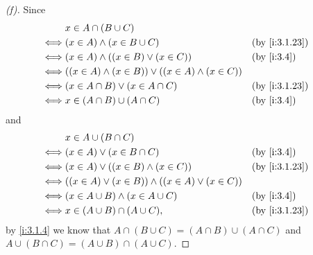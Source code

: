 \begin{proof}[(f)]
  Since
  \begin{align*}
         & x \in A \cap (B \cup C)                                                         \\
    \iff & (x \in A) \land (x \in B \cup C)                             &  & \by{i:3.1.23} \\
    \iff & (x \in A) \land ((x \in B) \lor (x \in C))                   &  & \by{i:3.4}    \\
    \iff & ((x \in A) \land (x \in B)) \lor ((x \in A) \land (x \in C))                    \\
    \iff & (x \in A \cap B) \lor (x \in A \cap C)                       &  & \by{i:3.1.23} \\
    \iff & x \in (A \cap B) \cup (A \cap C)                             &  & \by{i:3.4}
  \end{align*}
  and
  \begin{align*}
         & x \in A \cup (B \cap C)                                                        \\
    \iff & (x \in A) \lor (x \in B \cap C)                             &  & \by{i:3.4}    \\
    \iff & (x \in A) \lor ((x \in B) \land (x \in C))                  &  & \by{i:3.1.23} \\
    \iff & ((x \in A) \lor (x \in B)) \land ((x \in A) \lor (x \in C))                    \\
    \iff & (x \in A \cup B) \land (x \in A \cup C)                     &  & \by{i:3.4}    \\
    \iff & x \in (A \cup B) \cap (A \cup C),                           &  & \by{i:3.1.23}
  \end{align*}
  by \cref{i:3.1.4} we know that \(A \cap (B \cup C) = (A \cap B) \cup (A \cap C)\) and \(A \cup (B \cap C) = (A \cup B) \cap (A \cup C)\).
\end{proof}

